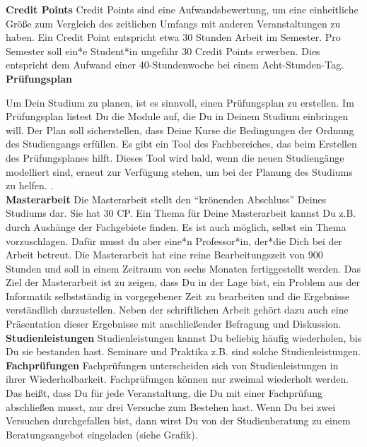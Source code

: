 {    \noindent\textbf{Credit Points}
    Credit Points sind eine Aufwandsbewertung, um eine einheitliche Größe zum Vergleich des zeitlichen Umfangs mit anderen Veranstaltungen zu haben. Ein Credit Point entspricht etwa 30 Stunden Arbeit im Semester. Pro Semester soll ein*e Student*in ungefähr 30 Credit Points erwerben. Dies entspricht dem Aufwand einer 40-Stundenwoche bei einem Acht-Stunden-Tag.\\


    \noindent\textbf{Prüfungsplan}

    Um Dein Studium zu planen, ist es sinnvoll, einen Prüfungsplan zu erstellen. Im Prüfungsplan listest Du  die Module auf, die Du in Deinem Studium einbringen will. Der Plan soll sicherstellen, dass Deine Kurse die Bedingungen der Ordnung des Studiengangs erfüllen. Es gibt ein Tool des Fachbereiches, das beim Erstellen des Prüfungsplanes hilft. Dieses Tool wird bald, wenn die neuen Studiengänge modelliert sind, erneut zur Verfügung stehen, um bei der Planung des Studiums zu helfen. \footnotemark[1].\\


    \noindent\textbf{Masterarbeit}
    Die Masterarbeit stellt den "`krönenden Abschluss"' Deines Studiums dar. Sie hat 30 CP. Ein Thema für Deine Masterarbeit kannst Du z.B. durch Aushänge der Fachgebiete finden. Es ist auch möglich, selbst ein Thema vorzuschlagen. Dafür musst du aber eine*n Professor*in, der*die Dich bei der Arbeit betreut. Die Masterarbeit hat eine reine Bearbeitungszeit von 900 Stunden und soll in einem Zeitraum von sechs Monaten fertiggestellt werden. Das Ziel der Masterarbeit ist zu zeigen, dass Du in der Lage bist, ein Problem aus der Informatik selbstständig in vorgegebener Zeit zu bearbeiten und die Ergebnisse verständlich darzustellen. Neben der schriftlichen Arbeit gehört dazu auch eine Präsentation dieser Ergebnisse mit anschließender Befragung und Diskussion.\\


    \noindent\textbf{Studienleistungen}
    Studienleistungen kannst Du beliebig häufig wiederholen, bis Du sie bestanden hast. Seminare und Praktika z.B. sind solche Studienleistungen.\\


    \noindent\textbf{Fachprüfungen}
    Fachprüfungen unterscheiden sich von Studienleistungen in ihrer Wiederholbarkeit. Fachprüfungen können nur zweimal wiederholt werden. Das heißt, dass Du für jede Veranstaltung, die Du mit einer Fachprüfung abschließen musst, nur drei Versuche zum Bestehen hast. Wenn Du bei zwei Versuchen durchgefallen bist, dann wirst Du von der Studienberatung zu einem Beratungsangebot eingeladen (siehe Grafik).

}

